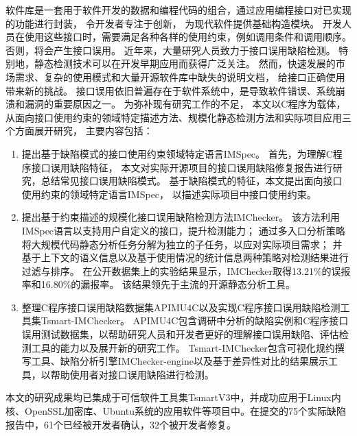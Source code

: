 \begin{cabstract}
  软件库是一套用于软件开发的数据和编程代码的组合，通过应用编程接口对已实现的功能进行封装，
  令开发者专注于创新，
  为现代软件提供基础构造模块。
  开发人员在使用这些接口时，需要满足各种各样的使用约束，例如调用条件和调用顺序。
  否则，将会产生接口误用。
  近年来，大量研究人员致力于接口误用缺陷检测。
  特别地，静态检测技术可以在开发早期应用而获得广泛关注。
  然而，快速发展的市场需求、复杂的使用模式和大量开源软件库中缺失的说明文档，
  给接口正确使用带来新的挑战。
  接口误用依旧普遍存在于软件系统中，是导致软件错误、系统崩溃和漏洞的重要原因之一。
  为弥补现有研究工作的不足，
  本文以C程序为载体，从面向接口使用约束的领域特定描述方法、规模化静态检测方法和实际项目应用三个方面展开研究，
  主要内容包括：
  \begin{enumerate}
  	\item 提出基于缺陷模式的接口使用约束领域特定语言IMSpec。
  	首先，为理解C程序接口误用缺陷特征，
  	本文对实际开源项目的接口误用缺陷修复报告进行研究，总结常见接口误用缺陷模式。
  	基于缺陷模式的特征，本文提出面向接口使用约束的领域特定语言IMSpec，
  	以描述实际项目中接口使用约束。
  	\item 提出基于约束描述的规模化接口误用缺陷检测方法IMChecker。
  	该方法利用IMSpec语言以支持用户自定义的接口，提升检测能力；
  	通过多入口分析策略将大规模代码静态分析任务分解为独立的子任务，以应对实际项目需求；
  	并基于上下文的语义信息以及基于使用情况的统计信息两种策略对检测结果进行过滤与排序。
  	在公开数据集上的实验结果显示，IMChecker取得13.21\%的误报率和16.80\%的漏报率。
  	该结果领先于主流的开源静态分析工具。
  	\item 整理C程序接口误用缺陷数据集APIMU4C以及实现C程序接口误用缺陷检测工具集Tsmart-IMChecker。
  	APIMU4C包含调研中分析的缺陷实例和C程序接口误用测试数据集，以帮助研究人员和开发者更好的理解接口误用缺陷、评估检测工具的能力以及展开新的研究工作。
  	Tsmart-IMChecker包含可视化规约撰写工具、缺陷分析引擎IMChecker-engine以及基于差异性对比的结果展示工具，以帮助使用者对接口误用缺陷进行检测。
  \end{enumerate}
  
  本文的研究成果均已集成于可信软件工具集TsmartV3中，并成功应用于Linux内核、OpenSSL加密库、Ubuntu系统的应用软件等项目中。在提交的75个实际缺陷报告中，61个已经被开发者确认，32个被开发者修复。
  
\end{cabstract}


